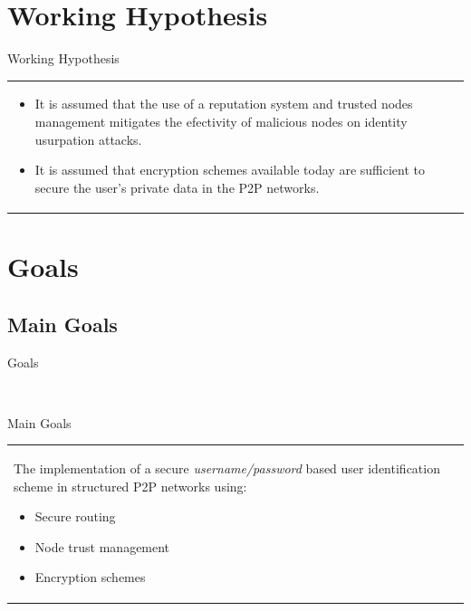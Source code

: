 \documentclass[12pt]{beamer}
\renewcommand{\frametitle}[1]{\vspace{0.2cm}\begin{huge}#1\end{huge}}
\renewcommand{\framesubtitle}[1]{\\ \vspace{0.4cm} \hspace{0.4cm}\begin{large}#1\end{large}}
\begin{document}
  \section{Working Hypothesis}
    \begin{frame}
    \frametitle{Working Hypothesis}
    \begin{table}
    \begin{tabular}{p{7cm}p{3cm}}
      \begin{itemize}
          \item It is assumed that the use of a reputation system and trusted nodes
            management mitigates the efectivity of malicious nodes on identity
            usurpation attacks.
          \item It is assumed that encryption schemes available today are
            sufficient to secure the user's private data in the P2P networks.
      \end{itemize}
    &
    \vspace{1.5cm}
    \end{tabular}
    \end{table}
    \end{frame}

  \section{Goals}
  \subsection{Main Goals}
    \begin{frame}
    \frametitle{Goals}
    \framesubtitle{Main Goals}
    \begin{table}
    \begin{tabular}{p{7cm}p{3cm}}
    The implementation of a secure \textit{username/password} based user identification scheme in structured P2P
    networks using:
    \begin{itemize}
      \item  Secure routing
      \item  Node trust management 
      \item  Encryption schemes
    \end{itemize}
    &
    \vspace{1.5cm}
    \end{tabular}
    \end{table}
    \end{frame}
\end{document}
